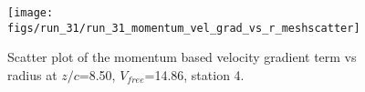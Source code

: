 \begin{figure}[H]
\centering
\texttt{[image: figs/run\_31/run\_31\_momentum\_vel\_grad\_vs\_r\_meshscatter]}
\caption{Scatter plot of the momentum based velocity gradient term vs radius at $z/c$=8.50, $V_{free}$=14.86, station 4.}
\label{fig:run_31_momentum_vel_grad_vs_r_meshscatter}
\end{figure}


